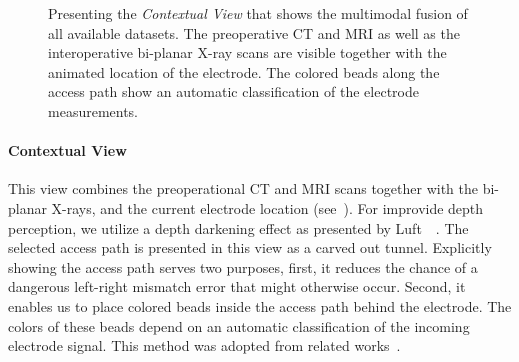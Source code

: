 \begin{figure}
\begin{subfigure}[b]{0.49\linewidth}
\end{subfigure}
\caption{Presenting the \emph{Contextual View} that shows the multimodal fusion of all available datasets. The preoperative CT and MRI as well as the interoperative bi-planar X-ray scans are visible together with the animated location of the electrode. The colored beads along the access path show an automatic classification of the electrode measurements.}
\label{contributions:medbio:dbs:contextual}
\end{figure}

\paragraph{Contextual View} This  view combines the preoperational CT and MRI scans together with the bi-planar X-rays, and the current electrode location (see~). For improvide depth perception, we utilize a depth darkening effect as presented by Luft~\etal~\cite{luft2006image}. The selected access path is presented in this view as a carved out tunnel. Explicitly showing the access path serves two purposes, first, it reduces the chance of a dangerous left-right mismatch error that might otherwise occur. Second, it enables us to place colored beads inside the access path behind the electrode. The colors of these beads depend on an automatic classification of the incoming electrode signal. This method was adopted from related works~\cite{Haese2005, Miocinovic2007}.


